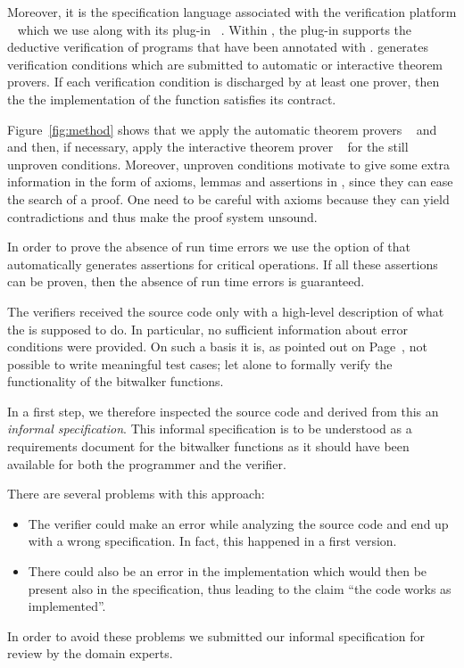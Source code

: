 Moreover, it is the specification language associated with 
the verification platform \framac~\cite{FramaC}
which we use along with its plug-in \framacwp~\cite{wp}.
Within \framac, the \wpframac plug-in supports
the deductive verification of \isoc programs that have been annotated with \acsl.
\framacwp generates verification conditions which are submitted to 
automatic or interactive theorem provers.
If each verification condition is discharged by at least one prover, then
the the implementation of the function satisfies its contract.

Figure~\ref{fig:method} shows that we apply the automatic
theorem provers \altergo~\cite{alt-ergo} and \cvc~\cite{cvc}
and then, if necessary, apply the interactive theorem prover \coq~\cite{Coq}
for the still unproven conditions.
Moreover, unproven conditions motivate to give some extra information
in the form of axioms, lemmas and assertions in \acsl, 
since they can ease the search of a proof.
One need to be careful with axioms because they can yield contradictions
and thus make the proof system unsound.

In order to prove the absence of run time errors we use
the  option of \wpframac that automatically generates \acsl
assertions for critical operations.
If all these assertions can be proven, then
the absence of run time errors is guaranteed.


\begin{framed}
The verifiers received the source code only with a high-level description
of what the \bitwalker is supposed to do.
In particular, no sufficient information about error conditions were provided.
On such a basis it is, as pointed out on Page~\pageref{lesson},
not possible to write meaningful test cases;
let alone to formally verify the functionality of the bitwalker functions.

In a first step, we therefore inspected the source code and 
derived from this an \emph{informal specification}.
This informal specification is to be understood
as a requirements document for the bitwalker functions as it should have been
available for both the programmer and the verifier.

There are several problems with this approach:
\begin{itemize}
\item
The verifier could make an error while analyzing the source code
and end up with a wrong specification. 
In fact, this happened in a first version.

\item
There could also be an error in the implementation which would then be present also
in the specification, thus leading to the claim ``the code works as implemented''.
\end{itemize}

In order to avoid these problems we submitted our informal specification
for review by the domain experts.
\end{framed}

